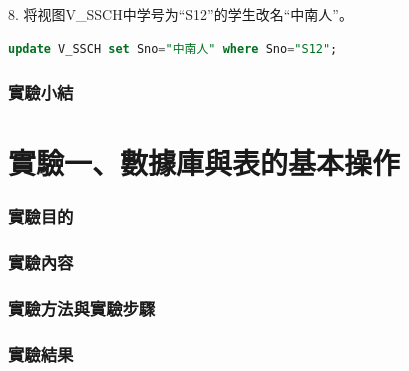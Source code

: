 \documentclass[12pt, a4paper]{report}
\begin{document}
8. 将视图V\_SSCH中学号为“S12”的学生改名“中南人”。\\

\begin{lstlisting}[language=SQL]
    update V_SSCH set Sno="中南人" where Sno="S12";
\end{lstlisting}

\begin{figure}[H] %
    \centering %
\end{figure}

\section{實驗小結}

\part{實驗一、數據庫與表的基本操作}

\section{實驗目的}



\section{實驗內容}

\section{實驗方法與實驗步驟}

\section{實驗結果}
\end{document}

